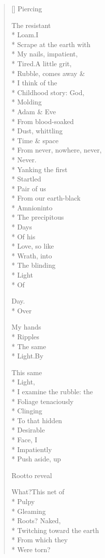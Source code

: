 \begin{verse}[\versewidth]
Piercing


The resistant\\*
Loam.\quad I\\*
Scrape at the earth with\\*
My nails, impatient,\\*
Tired.\quad A little grit,\\*
Rubble, comes away \&\\*
I think of the\\*
Childhood story: God, \\*
Molding\\*
Adam \& Eve\\*
From blood-soaked\\*
Dust, whittling\\*
Time \& space\\*
From never, nowhere, never,\\*
Never.\\*
Yanking the first\\*
Startled \\*
Pair of us\\*
From our earth-black\\*
Amnion\quad into\\*
The precipitous\\*
Days \\*
Of his\\*
Love, so like\\*
Wrath, into \\*
The blinding\\*
Light\\*
Of

Day.\\*
Over

My hands\\*
Ripples\\*
The same\\*
Light.\quad By


This same\\*
Light,\\*
I examine the rubble: the\\*
Foliage tenaciously\\*
Clinging\\*
To that hidden\\*
Desirable\\*
Face, I\\*
Impatiently\\*
Push aside, up

Root\qquad to reveal

What?\qquad This net of\\*
Pulpy\\*
Gleaming\\*
Roots?  Naked,\\*
Twitching toward the earth\\*
From which they\\*
Were torn?


\end{verse}
